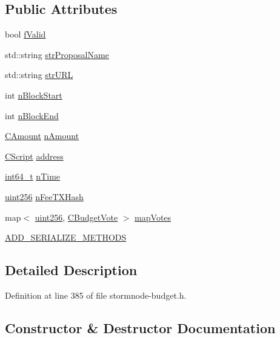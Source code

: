 \subsection*{Public Attributes}
\begin{DoxyCompactItemize}
\item 
bool \hyperlink{class_c_budget_proposal_ab2222fd5e4fc51881d82b9c7dc6a0f10}{f\+Valid}
\item 
std\+::string \hyperlink{class_c_budget_proposal_ab881106333b75bf1a8c5c97d56cd6703}{str\+Proposal\+Name}
\item 
std\+::string \hyperlink{class_c_budget_proposal_ac6ff1965ce0dca34221ec041ae831e83}{str\+U\+R\+L}
\item 
int \hyperlink{class_c_budget_proposal_a40a5d7e56c5ef1636b48bb67e6619e32}{n\+Block\+Start}
\item 
int \hyperlink{class_c_budget_proposal_a384863d009b95fd48d50f41891e41840}{n\+Block\+End}
\item 
\hyperlink{amount_8h_a4eaf3a5239714d8c45b851527f7cb564}{C\+Amount} \hyperlink{class_c_budget_proposal_ad40f0d2ff6c0bef605d405fbcb36136c}{n\+Amount}
\item 
\hyperlink{class_c_script}{C\+Script} \hyperlink{class_c_budget_proposal_abec3e0b5b46ac1a8aad65b4144b87782}{address}
\item 
\hyperlink{stdint_8h_adec1df1b8b51cb32b77e5b86fff46471}{int64\+\_\+t} \hyperlink{class_c_budget_proposal_a73bbfda4189ae03fdecc3d6ddf984a42}{n\+Time}
\item 
\hyperlink{classuint256}{uint256} \hyperlink{class_c_budget_proposal_aba9937f0c86385b04d0fd5eb136ce999}{n\+Fee\+T\+X\+Hash}
\item 
map$<$ \hyperlink{classuint256}{uint256}, \hyperlink{class_c_budget_vote}{C\+Budget\+Vote} $>$ \hyperlink{class_c_budget_proposal_a83239972ab9db545206ac7e59740bfab}{map\+Votes}
\item 
\hyperlink{class_c_budget_proposal_ad35aca18a74a65dd6df2a04536253174}{A\+D\+D\+\_\+\+S\+E\+R\+I\+A\+L\+I\+Z\+E\+\_\+\+M\+E\+T\+H\+O\+D\+S}
\end{DoxyCompactItemize}


\subsection{Detailed Description}


Definition at line 385 of file stormnode-\/budget.\+h.



\subsection{Constructor \& Destructor Documentation}
\hypertarget{class_c_budget_proposal_a30d26a2189f74f7c1f55db353569c366}{}
